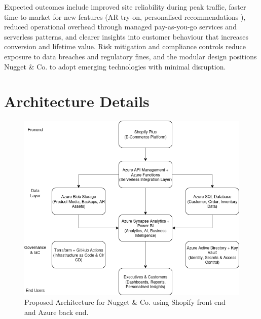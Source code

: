 \documentclass[12pt, a4paper, twoside]{article} %
\begin{document}
Expected outcomes include improved site reliability during peak traffic, faster time-to-market for new features (AR try-on, personalised recommendations \citep{bialkova2022}), reduced operational overhead through managed pay-as-you-go services and serverless patterns, and clearer insights into customer behaviour that increases conversion and lifetime value. Risk mitigation and compliance controls reduce exposure to data breaches and regulatory fines, and the modular design positions Nugget \& Co. to adopt emerging technologies with minimal disruption. 

\section{Architecture Details}

\begin{figure}[h!]
 \includegraphics[width=\linewidth]{NuggetArch.png}
 \caption{Proposed Architecture for Nugget \& Co. using Shopify front end and Azure back end.}
 \label{fig:Arch}
\end{figure}
\end{document}
